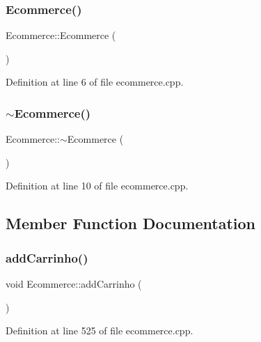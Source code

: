 \subsubsection{\texorpdfstring{Ecommerce()}{Ecommerce()}}
{\footnotesize\ttfamily Ecommerce\+::\+Ecommerce (\begin{DoxyParamCaption}{ }\end{DoxyParamCaption})}



Definition at line 6 of file ecommerce.\+cpp.

\mbox{\label{class_ecommerce_ac2a64ea1d418ea95c0d2b604f09cb931}} 
\subsubsection{\texorpdfstring{$\sim$\+Ecommerce()}{~Ecommerce()}}
{\footnotesize\ttfamily Ecommerce\+::$\sim$\+Ecommerce (\begin{DoxyParamCaption}{ }\end{DoxyParamCaption})}



Definition at line 10 of file ecommerce.\+cpp.



\subsection{Member Function Documentation}
\mbox{\label{class_ecommerce_af2624f7386194d09f7766756f3c08d73}} 
\subsubsection{\texorpdfstring{add\+Carrinho()}{addCarrinho()}}
{\footnotesize\ttfamily void Ecommerce\+::add\+Carrinho (\begin{DoxyParamCaption}{ }\end{DoxyParamCaption})}



Definition at line 525 of file ecommerce.\+cpp.

\mbox{\label{class_ecommerce_a02ae0b7c3a6f79748410137ba513fee9}} 
